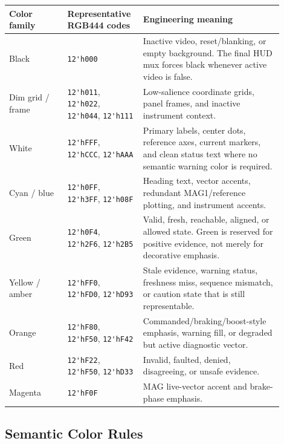 \documentclass{article}
\newcommand{\sig}[1]{\begingroup\nolinkurl{#1}\endgroup}
\begin{document}
\begin{longtable}{p{0.20\linewidth} p{0.22\linewidth} p{0.48\linewidth}}
\toprule
\textbf{Color family} & \textbf{Representative RGB444 codes} & \textbf{Engineering meaning} \\
\midrule
\endhead
Black &
\sig{12'h000} &
Inactive video, reset/blanking, or empty background.  The final HUD mux forces
black whenever active video is false. \\

Dim grid / frame &
\sig{12'h011}, \sig{12'h022}, \sig{12'h044}, \sig{12'h111} &
Low-salience coordinate grids, panel frames, and inactive instrument context. \\

White &
\sig{12'hFFF}, \sig{12'hCCC}, \sig{12'hAAA} &
Primary labels, center dots, reference axes, current markers, and clean status
text where no semantic warning color is required. \\

Cyan / blue &
\sig{12'h0FF}, \sig{12'h3FF}, \sig{12'h08F} &
Heading text, vector accents, redundant MAG1/reference plotting, and
instrument accents. \\

Green &
\sig{12'h0F4}, \sig{12'h2F6}, \sig{12'h2B5} &
Valid, fresh, reachable, aligned, or allowed state.  Green is reserved for
positive evidence, not merely for decorative emphasis. \\

Yellow / amber &
\sig{12'hFF0}, \sig{12'hFD0}, \sig{12'hD93} &
Stale evidence, warning status, freshness miss, sequence mismatch, or caution
state that is still representable. \\

Orange &
\sig{12'hF80}, \sig{12'hF50}, \sig{12'hF42} &
Commanded/braking/boost-style emphasis, warning fill, or degraded but active
diagnostic vector. \\

Red &
\sig{12'hF22}, \sig{12'hF50}, \sig{12'hD33} &
Invalid, faulted, denied, disagreeing, or unsafe evidence. \\

Magenta &
\sig{12'hF0F} &
MAG live-vector accent and brake-phase emphasis. \\
\bottomrule
\end{longtable}

\subsection{Semantic Color Rules}
\end{document}
